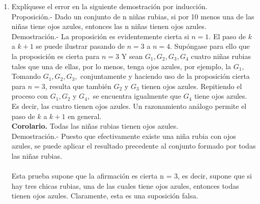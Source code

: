 \begin{enumerate}[\bfseries  1.]
\item Explíquese el error en la siguiente demostración por inducción.\\
Proposición.- Dado un conjunto de n niñas rubias, si por 10 menos una de las niñas tiene ojos azules, entonces las n niñas tienen ojos azules.\\
Demostración.-\; La proposición es evidentemente cierta si $n = 1$. El paso de $k$ a $k + 1$ se puede ilustrar pasando de $n = 3$ a $n = 4$. Supóngase para ello que la proposición es cierta para $n=3$ Y sean $G_1, G_2, G_3, G_4$ cuatro niñas rubias tales que una de ellas, por lo menos, tenga ojos azules, por ejemplo, la $G_1$, Tomando $G_1,G_2, G_3,$ conjuntamente y haciendo uso de la proposición cierta para $n =3$, resulta que también $G_2$ y $G_3$ tienen ojos azules. Repitiendo el proceso con $G_1, G_2$ y $G_4,$ se encuentra igualmente que $G_4$ tiene ojos azules. Es decir, las cuatro tienen ojos azules. Un razonamiento análogo permite el paso de $k$ a $k + 1$ en general.\\
\textbf{Corolario.} Todas las niñas rubias tienen ojos azules.\\
Demostración.- \; Puesto que efectivamente existe una niña rubia con ojos azules, se puede aplicar el resultado precedente al conjunto formado por todas las niñas rubias.\\\\
Esta prueba supone que la afirmación es cierta n = 3, es decir, supone que si hay tres chicas rubias, una de las cuales tiene ojos azules, entonces todas tienen ojos azules. Claramente, esta es una suposición falsa.\\\\
\end{enumerate}

\setcounter{section}{6}
